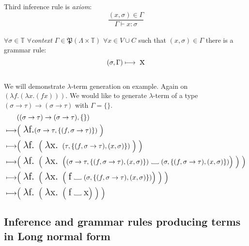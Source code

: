 \documentclass[12pt,a4paper]{report}
\newcommand{\lterm}{$\lambda$-term\xspace}
\newcommand\Vtextvisiblespace[1][.3em]{%
  \mbox{\kern.06em\vrule height.3ex}%
  \vbox{\hrule width#1}%
  \hbox{\vrule height.3ex}}
\begin{document}
Third inference rule is {\it axiom}: 
\[
		\frac{( x , \sigma )  \in \Gamma}
		     {\Gamma \vdash x : \sigma}
\]
\\
$\forall \sigma \in \mathbb{T}$ 
$\forall${\it context} $\Gamma \in \mathfrak P \left({\Lambda \times  \mathbb{T}}\right) $ 
$\forall x \in V \cup C $ such that $(x,\sigma) \in \Gamma$ 
there is a grammar rule:
\[ 
	( \sigma , \Gamma )  \longmapsto \mbox{ {\Large x}}
\]
\\

We will demonstrate \lterm generation on example. 
Again on $(\lambda f . (\lambda x . (f x) ))$. 
We would like to generate \lterm of a type 
$(\sigma \rightarrow \tau) \rightarrow (\sigma \rightarrow \tau)$
with $\Gamma = \{\}$.
\begin{align*}
	& ((\sigma \rightarrow \tau) \rightarrow (\sigma \rightarrow \tau),\{\}) \\ 
	\longmapsto & \Big( \mbox{ {\Large $\lambda$f.}}
	  ( \sigma \rightarrow \tau , \{ (f,\sigma \rightarrow \tau) \} ) 
	~ \Big)
	\\
	\longmapsto & 
	\Big( \mbox{ {\Large $\lambda$f. }}
		\Big( \mbox{ {\Large $\lambda$x. }}
	  	 	( \tau , \{ (f,\sigma \rightarrow \tau) , (x,\sigma) \} ) 
		~ \Big)  	 
	~ \Big)
	\\
	\longmapsto & 
	\Big( \mbox{ {\Large $\lambda$f. }}
		\Big( \mbox{ {\Large $\lambda$x. }}	  	 	
	  	 	\Big( 
	  	 	  ( \sigma \rightarrow \tau , \{ (f,\sigma \rightarrow \tau) , (x,\sigma) \} ) 
			  \mbox{ \Vtextvisiblespace[1em] } 
			  ( \sigma , \{ (f,\sigma \rightarrow \tau) , (x,\sigma) \} )  \Big) 
		~ \Big)  	 
	 ~ \Big)
	\\
	\longmapsto & 
	\Big( \mbox{ {\Large $\lambda$f. }}
		\Big( \mbox{ {\Large $\lambda$x. }}	  	 	
	  	 	\Big( 
	  	 	  \mbox{ {\Large f}} 
			  \mbox{ \Vtextvisiblespace[1em] } 
			  ( \sigma , \{ (f,\sigma \rightarrow \tau) , (x,\sigma) \} ) \Big) 
		~ \Big)  	 
	~ \Big)		
	\\
	\longmapsto & 
	\Big( \mbox{ {\Large $\lambda$f. }}
		\Big( \mbox{ {\Large $\lambda$x. }}	  	 	
	  	 	\Big( 
	  	 	  \mbox{ {\Large f}} 
			  \mbox{ \Vtextvisiblespace[1em] } 
			  \mbox{{\Large x}} \Big) 
		~ \Big)  	 
	~ \Big)
\end{align*}

\subsection{Inference and grammar rules producing 
terms in Long normal form}
\label{barlike}
\end{document}

